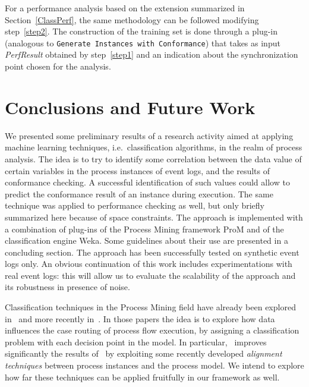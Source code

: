 \documentclass{llncs}
\begin{document}
For a  performance analysis based on the extension summarized in Section~\ref{ClassPerf}, the same methodology can be followed modifying step~\ref{step2}. The construction of the training set is done through a plug-in (analogous to \texttt{Generate Instances with Conformance}) that takes as input \emph{PerfResult} obtained by step~\ref{step1} and an indication about the synchronization point chosen for the analysis.

\section{Conclusions and Future Work}

We presented some preliminary results of a research activity aimed at applying machine learning techniques, i.e.~classification algorithms, in the realm of process analysis. The idea is to try to identify some correlation between the data value of certain variables in the process instances of event logs, and the results of conformance checking. A successful identification of such values could allow to predict the conformance result  of an instance during execution.  The same technique was applied to performance checking as well, but only briefly summarized here because of space constraints. The approach is implemented with a combination of plug-ins of the Process Mining framework ProM and of the classification engine Weka. Some guidelines about their use are presented in a concluding section. 
The approach has been successfully tested on synthetic event logs only. An obvious continuation of this work includes experimentations with real event logs: this will allow us to evaluate the scalability of the approach and its robustness in presence of noise.


Classification techniques in the Process Mining field have already been explored in~\cite{DBLP:conf/bpm/RozinatA06} and more recently in~\cite{DBLP:conf/sac/LeoniA13}. In those papers the  idea is to  explore how data influences the case routing of process flow execution, by assigning a classification problem with each decision point in the model. In particular,~\cite{DBLP:conf/sac/LeoniA13} improves significantly the results of~\cite{DBLP:conf/bpm/RozinatA06} by exploiting some recently developed \emph{alignment techniques} between process instances and the process model. We intend to explore how far these techniques can be applied fruitfully in our framework as well.



 
\end{document}
